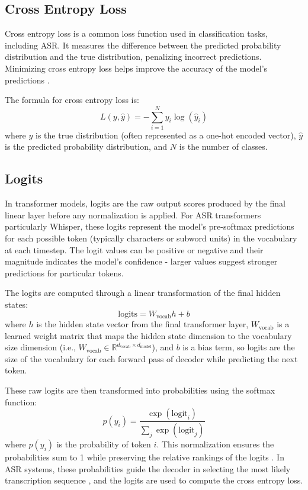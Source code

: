 \documentclass[../report.tex]{subfiles}
\begin{document}
    \subsection{Cross Entropy Loss}
    Cross entropy loss is a common loss function used in classification tasks, including ASR. It measures the difference between the predicted probability distribution and the true distribution, penalizing incorrect predictions. Minimizing cross entropy loss helps improve the accuracy of the model's predictions \cite{pmlr-v202-mao23b, pmlr-v137-gordon-rodriguez20a}.

    The formula for cross entropy loss is:
    \begin{equation}
        L(y, \hat{y}) = -\sum_{i=1}^{N} y_i \log(\hat{y}_i)
        \label{eq:cross_entropy}
    \end{equation}
    where $y$ is the true distribution (often represented as a one-hot encoded vector), $\hat{y}$ is the predicted probability distribution, and $N$ is the number of classes.


    \subsection{Logits}
    In transformer models, logits are the raw output scores produced by the final linear layer before any normalization is applied. For ASR transformers particularly Whisper, these logits represent the model's pre-softmax predictions for each possible token (typically characters or subword units) in the vocabulary at each timestep. The logit values can be positive or negative and their magnitude indicates the model's confidence - larger values suggest stronger predictions for particular tokens.

    The logits are computed through a linear transformation of the final hidden states:
    \begin{equation}
        \text{logits} = W_{\text{vocab}} h + b
        \label{eq:logits}
    \end{equation}
    where $h$ is the hidden state vector from the final transformer layer, $W_{\text{vocab}}$ is a learned weight matrix that maps the hidden state dimension to the vocabulary size dimension (i.e., $W_{\text{vocab}} \in \mathbb{R}^{d_{\text{vocab}} \times d_{\text{model}}}$), and $b$ is a bias term, so logits are the size of the vocabulary for each forward pass of decoder while predicting the next token.

    These raw logits are then transformed into probabilities using the softmax function:
    \begin{equation}
        p(y_i) = \frac{\exp(\text{logit}_i)}{\sum_j \exp(\text{logit}_j)}
    \end{equation}
    where $p(y_i)$ is the probability of token $i$. This normalization ensures the probabilities sum to 1 while preserving the relative rankings of the logits \cite{bishop2006pattern}. In ASR systems, these probabilities guide the decoder in selecting the most likely transcription sequence \cite{radford2023robust}, and the logits are used to compute the cross entropy loss.
\end{document}
